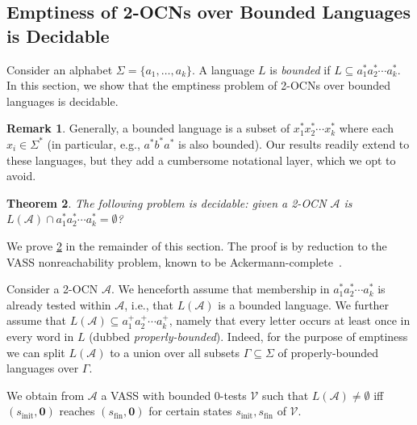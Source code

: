 \documentclass[11pt,a4paper]{amsart}
\newtheorem{theorem}{Theorem}
\theoremstyle{definition}
\newtheorem{remark}[theorem]{Remark}
\newcommand{\shtodo}[1]{\todo[color=cyan!25,size=\small]{SH: #1}}
\renewcommand{\vec}[1]{\boldsymbol{#1}}
\newcommand{\cA}{\mathcal{A}}
\newcommand{\cV}{\mathcal{V}}
\begin{document}
\subsection{Emptiness of 2-OCNs over Bounded Languages is Decidable}
\label{sec:bounded_languages}
\label{sec:2OCN_Bounded_to_VASS_intuitive} 
Consider an alphabet $\Sigma=\{a_1,\ldots,a_k\}$. A language $L$ is \emph{bounded} if $L\subseteq
a_1^*a_2^*\cdots a_k^*$. In this section, we show that the emptiness problem of
2-OCNs over bounded languages is decidable.
\begin{remark} %
	Generally, a bounded language is a subset of $x_1^*x_2^*\cdots x_k^*$ where each
	$x_i\in \Sigma^*$ (in particular, e.g., $a^*b^*a^*$ is also bounded). Our results
	readily extend to these languages, but they add a cumbersome notational
	layer, which we opt to avoid.
\end{remark}

\begin{theorem}
	\label{thm:emptiness_bounded_decidable} The following problem is decidable:
	given a 2-OCN $\cA$ is $L(\cA)\cap a_1^*a_2^*\cdots a_k^* = \emptyset$?
\end{theorem} 

We prove \cref{thm:emptiness_bounded_decidable} in the remainder of this section. The proof is by reduction to the VASS nonreachability problem, known to be
Ackermann-complete~\cite{czerwinski2022reachability}. 

Consider a 2-OCN $\cA$. We henceforth assume that membership in $a_1^*a_2^*\cdots a_k^*$ is already
tested within $\cA$, i.e., that $L(\cA)$ is a bounded language. We further assume
that $L(\cA)\subseteq a_1^+a_2^+\cdots a_k^+$, namely that every letter occurs at least once
in every word in $L$ (dubbed \emph{properly-bounded}). Indeed, for the purpose
of emptiness we can split $L(\cA)$ to a union over all subsets $\Gamma\subseteq \Sigma$ of
properly-bounded languages over $\Gamma$.

We obtain from $\cA$ a VASS with bounded 0-tests $\cV$ such that $L(\cA)\neq \emptyset$ iff
$(s_{\textrm{init}},\vec{0})$ reaches $(s_{\textrm{fin}},\vec{0})$ for certain
states $s_{\textrm{init}},s_{\textrm{fin}}$ of $\cV$.
\end{document}
